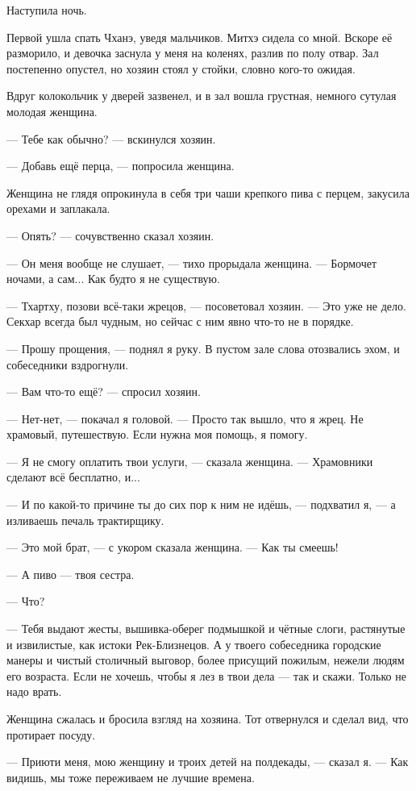 Наступила ночь.

Первой ушла спать Чханэ, уведя мальчиков.
Митхэ сидела со мной.
Вскоре её разморило, и девочка заснула у меня на коленях, разлив по полу отвар.
Зал постепенно опустел, но хозяин стоял у стойки, словно кого-то ожидая.

Вдруг колокольчик у дверей зазвенел, и в зал вошла грустная, немного сутулая молодая женщина.

--- Тебе как обычно? --- вскинулся хозяин.

--- Добавь ещё перца, --- попросила женщина.

Женщина не глядя опрокинула в себя три чаши крепкого пива с перцем, закусила орехами и заплакала.

--- Опять? --- сочувственно сказал хозяин.

--- Он меня вообще не слушает, --- тихо прорыдала женщина.
--- Бормочет ночами, а сам...
Как будто я не существую.

--- Тхартху, позови всё-таки жрецов, --- посоветовал хозяин.
--- Это уже не дело.
Секхар всегда был чудным, но сейчас с ним явно что-то не в порядке.

--- Прошу прощения, --- поднял я руку.
В пустом зале слова отозвались эхом, и собеседники вздрогнули.

--- Вам что-то ещё? --- спросил хозяин.

--- Нет-нет, --- покачал я головой.
--- Просто так вышло, что я жрец.
Не храмовый, путешествую.
Если нужна моя помощь, я помогу.

--- Я не смогу оплатить твои услуги, --- сказала женщина.
--- Храмовники сделают всё бесплатно, и...

--- И по какой-то причине ты до сих пор к ним не идёшь, --- подхватил я, --- а изливаешь печаль трактирщику.

--- Это мой брат, --- с укором сказала женщина.
--- Как ты смеешь!

--- А пиво --- твоя сестра.

--- Что?

--- Тебя выдают жесты, вышивка-оберег подмышкой и чётные слоги, растянутые и извилистые, как истоки Рек-Близнецов.
А у твоего собеседника городские манеры и чистый столичный выговор, более присущий пожилым, нежели людям его возраста.
Если не хочешь, чтобы я лез в твои дела --- так и скажи.
Только не надо врать.

Женщина сжалась и бросила взгляд на хозяина.
Тот отвернулся и сделал вид, что протирает посуду.

--- Приюти меня, мою женщину и троих детей на полдекады, --- сказал я.
--- Как видишь, мы тоже переживаем не лучшие времена.

